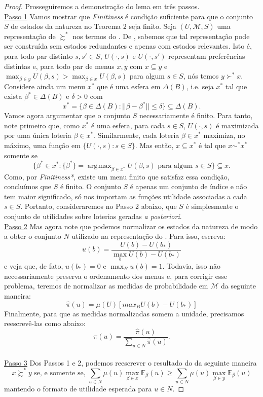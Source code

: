 \documentclass[11pt, a4paper]{article}
\theoremstyle{nonumberplain}
\newtheorem{proof}{Dem.}
\theoremstyle{plain}
\theoremstyle{plain}
\theoremstyle{plain}
\theoremstyle{nonumberplain}
\DeclareMathOperator*{\argmax}{\arg\!\max}
\begin{document}
\begin{proof}
Prosseguiremos a demonstração do lema em três passos.\\
\underline{Passo 1} Vamos mostrar que \emph{Finitiness} é condição suficiente para que o conjunto $S$ de estados da natureza no Teorema 2 seja finito. Seja $(U,\mathcal{M},S)$ uma representação de $\succsim^*$ nos termos do . De \cite{Kochov2007}, sabemos que tal representação pode ser construída sem estados redundantes e apenas com estados relevantes. Isto é, para todo par distinto $s,s'\in S$, $U(\cdot,s)$ e $U(\cdot,s')$ representam preferências distintas e, para todo par de menus $x,y$ com $x\subseteq y$ e $\max_{\beta \in y}U(\beta,s)>\max_{\beta \in x}U(\beta,s)$ para algum $s\in S$, nós temos $y\succ^* x$. Considere ainda um menu $x^*$ que é uma esfera em $\Delta (B)$, i.e. seja $x^*$ tal que exista $\beta^*\in\Delta(B)$ e $\delta>0$ com $$x^*=\{\beta\in\Delta(B):||\beta-\beta^*||\leq\delta\}\subseteq\Delta(B).$$
Vamos agora argumentar que o conjunto $S$ necessariamente é finito. Para tanto, note primeiro que, como $x^*$ é uma esfera, para cada $s\in S$, $U(\cdot,s)$ é maximizada por uma única loteria $\beta\in x^*$. Similarmente, cada loteria $\beta\in x^*$ maximiza, no máximo, uma função em $\{U(\cdot,s): s\in S\}$. Mas então, $x\subseteq x^*$ é tal que $x\sim^* x^*$ somente se $$\{\beta^* \in x^* : \{\beta^*\}=\argmax_{\beta\in x^*} U(\beta,s)\text{ para algum }s\in S\} \subseteq x.$$ Como, por \emph{Finitiness*}, existe um menu finito que satisfaz essa condição, concluímos que $S$ é finito.
O conjunto $S$ é apenas um conjunto de índice e não tem maior significado, só nos importam as funções utilidade associadas a cada $s\in S$. Portanto, consideraremos no Passo 2 abaixo, que $S$ é simplesmente o conjunto de utilidades sobre loterias geradas \emph{a posteriori}.
\\
\noindent
\underline{Passo 2} Mas agora note que podemos normalizar os estados da natureza de modo a obter o conjunto $N$ utilizado na representação do . Para isso, escreva:
$$u(b)=\frac{U(b)-U(b_*)}{\max_b U(b)-U(b_*)}$$
e veja que, de fato, $u(b_*)=0$ e $\max_{B} u(b)=1$. Todavia, isso não necessariamente preserva o ordenamento dos menus e, para corrigir esse problema, teremos de normalizar as medidas de probabilidade em $\mathcal{M}$ da seguinte maneira:
$$ \hat{\pi}(u)=\mu(U)\left[max_B U(b)-U(b_*)\right]$$ Finalmente, para que as medidas normalizadas somem a unidade, precisamos reescrevê-las como abaixo: \[\pi(u)=\frac{\hat{\pi}(u)}{\sum_{u\in N}\hat{\pi}(u)}.\]\\
\noindent
\underline{Passo 3} Dos Passos 1 e 2, podemos reescrever o resultado do  da seguinte maneira $$x\succsim^* y \text{ se, e somente se, } \sum_{u\in N} \mu(u)\max_{\beta\in x}\mathbb{E}_\beta(u) \geq \sum_{u\in N} \mu(u)\max_{\beta\in y}\mathbb{E}_\beta(u)$$
mantendo o formato de utilidade esperada para $u\in N$.
\end{proof}
\end{document}
